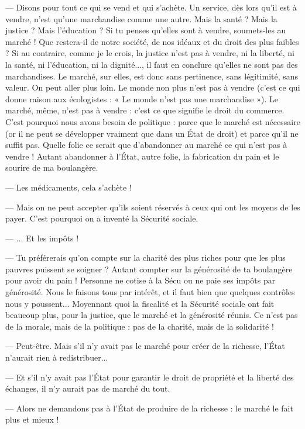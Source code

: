 — Disons pour tout ce qui se vend et qui s’achète. Un service, dès lors qu’il
est à vendre, n’est qu’une marchandise comme une autre. Mais la santé ? Mais
la justice ? Mais l'éducation ? Si tu penses qu’elles sont à vendre, soumets-les au
marché ! Que restera-il de notre société, de nos idéaux et du droit des plus
faibles ? Si au contraire, comme je le crois, la justice n’est pas à vendre, ni la
liberté, ni la santé, ni l'éducation, ni la dignité..., il faut en conclure qu’elles ne
sont pas des marchandises. Le marché, sur elles, est donc sans pertinence, sans
légitimité, sans valeur. On peut aller plus loin. Le monde non plus n’est pas à
vendre (c’est ce qui donne raison aux écologistes : « Le monde n’est pas une
marchandise »). Le marché, même, n’est pas à vendre : c’est ce que signifie le
droit du commerce. C’est pourquoi nous avons besoin de politique : parce que
le marché est nécessaire (or il ne peut se développer vraiment que dans un État
de droit) et parce qu’il ne suffit pas. Quelle folie ce serait que d’abandonner au
marché ce qui n’est pas à vendre ! Autant abandonner à l’État, autre folie, la
fabrication du pain et le sourire de ma boulangère.

— Les médicaments, cela s’achète !

— Mais on ne peut accepter qu’ils soient réservés à ceux qui ont les moyens
de les payer. C’est pourquoi on a inventé la Sécurité sociale.

— ... Et les impôts !

— Tu préférerais qu’on compte sur la charité des plus riches pour que les
plus pauvres puissent se soigner ? Autant compter sur la générosité de ta boulangère
 pour avoir du pain ! Personne ne cotise à la Sécu ou ne paie ses impôts
par générosité. Nous le faisons tous par intérêt, et il faut bien que quelques
contrôles nous y poussent... Moyennant quoi la fiscalité et la Sécurité sociale
ont fait beaucoup plus, pour la justice, que le marché et la générosité réunis. Ce
n'est pas de la morale, mais de la politique : pas de la charité, mais de la
solidarité !

— Peut-être. Mais s’il n’y avait pas le marché pour créer de la richesse, l’État
n'aurait rien à redistribuer...

— Et s’il n’y avait pas l’État pour garantir le droit de propriété et la liberté
des échanges, il n’y aurait pas de marché du tout.

— Alors ne demandons pas à l’État de produire de la richesse : le marché le
fait plus et mieux !


